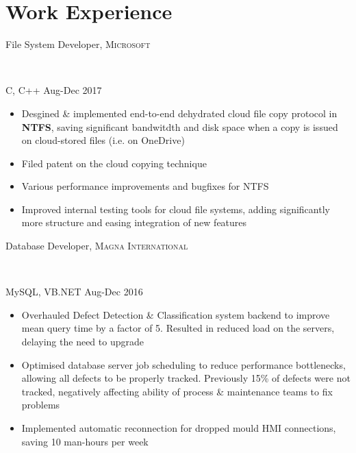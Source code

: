 \documentclass[letterpaper,10pt]{article}
\begin{document}
\begin{minipage}[t]{0.60\textwidth} %

\section{Work Experience}
\medskip

\begin{large}
File System Developer, \textsc{Microsoft}
\end{large}\\
\medskip
\begin{footnotesize}
C, C++ \hfill Aug-Dec 2017
\end{footnotesize}
\begin{itemize}
    \item {Desgined \& implemented end-to-end dehydrated cloud file copy protocol in \textbf{NTFS}, saving significant bandwitdth and disk space when a copy is issued on cloud-stored files (i.e. on OneDrive)}
    \item {Filed patent on the cloud copying technique}   %
    \item {Various performance improvements and bugfixes for NTFS}
    \item {Improved internal testing tools for cloud file systems, adding significantly more structure and easing integration of new features}
\end{itemize}
\bigskip

\begin{large}
Database Developer, \textsc{Magna International}
\end{large}\\
\medskip
\begin{footnotesize}
MySQL, VB.NET \hfill Aug-Dec 2016
\end{footnotesize}
\begin{itemize}
    \item {Overhauled Defect Detection \& Classification system backend to improve mean query time by a factor of 5. Resulted in reduced load on the servers, delaying the need to upgrade}
    \item {Optimised database server job scheduling to reduce performance bottlenecks, allowing all defects to be properly tracked. Previously 15\% of defects were not tracked, negatively affecting ability of process \& maintenance teams to fix problems}
    \item {Implemented automatic reconnection for dropped mould HMI connections, saving 10 man-hours per week}
\end{itemize}
\bigskip


\end{minipage}
\end{document}
